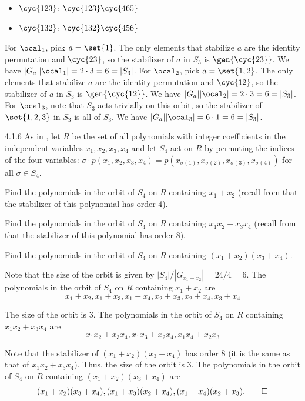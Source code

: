 \begin{solenum}
\begin{itemize}
		\item $\cyc{1 2 3}$: $\cyc{1 2 3}\cyc{4 6 5}$
		\item $\cyc{1 3 2}$: $\cyc{1 3 2}\cyc{4 5 6}$
	\end{itemize}
	For $\ocal_1$, pick $a = \set{1}$.
	The only elements that stabilize $a$ are the identity permutation and $\cyc{2 3}$, so the stabilizer of $a$ in $S_3$ is $\gen{\cyc{2 3}}$.
	We have $|G_a||\ocal_1| = 2 \cdot 3 = 6 = |S_3|$.
	For $\ocal_2$, pick $a = \set{1, 2}$.
	The only elements that stabilize $a$ are the identity permutation and $\cyc{1 2}$, so the stabilizer of $a$ in $S_3$ is $\gen{\cyc{1 2}}$.
	We have $|G_a||\ocal_2| = 2 \cdot 3 = 6 = |S_3|$.
	For $\ocal_3$, note that $S_3$ acts trivially on this orbit, so the stabilizer of $\set{1, 2, 3}$ in $S_3$ is all of $S_3$.
	We have $|G_a||\ocal_3| = 6 \cdot 1 = 6 = |S_3|$.
\end{solenum}

\begin{exercise}{4.1.6}
	As in , let $R$ be the set of all polynomials with integer coefficients in the independent variables \(x_1,x_2,x_3,x_4\) and let $S_4$ act on $R$ by permuting the indices of the four variables: \(\sigma \cdot p(x_1,x_2,x_3,x_4) = p(x_{\sigma(1)}, x_{\sigma(2)}, x_{\sigma(3)}, x_{\sigma(4)})\) for all \(\sigma \in S_4\).
	\begin{subexercises}
		\item Find the polynomials in the orbit of $S_4$ on $R$ containing \(x_1 + x_2\) (recall from  that the stabilizer of this polynomial has order 4).
		\item Find the polynomials in the orbit of $S_4$ on $R$ containing \(x_1 x_2 + x_3 x_4\) (recall from  that the stabilizer of this polynomial has order 8).
		\item Find the polynomials in the orbit of $S_4$ on $R$ containing \((x_1 + x_2)(x_3 + x_4)\).
	\end{subexercises}
\end{exercise}

\begin{solenum}
	\item Note that the size of the orbit is given by \(|S_4|/|G_{x_1 + x_2}| = 24/4 = 6\).
	The polynomials in the orbit of $S_4$ on $R$ containing \(x_1 + x_2\) are
	\[
		x_1 + x_2, x_1 + x_3, x_1 + x_4, x_2 + x_3, x_2 + x_4, x_3 + x_4
	\]
	\item The size of the orbit is 3.
	The polynomials in the orbit of $S_4$ on $R$ containing \(x_1 x_2 + x_3 x_4\) are
	\[
		x_1 x_2 + x_3 x_4, x_1 x_3 + x_2 x_4, x_1 x_4 + x_2 x_3
	\]
	\item Note that the stabilizer of \((x_1 + x_2)(x_3 + x_4)\) has order 8 (it is the same as that of \(x_1 x_2 + x_3 x_4\)).
	Thus, the size of the orbit is 3.
	The polynomials in the orbit of $S_4$ on $R$ containing \((x_1 + x_2)(x_3 + x_4)\) are
	\[
		(x_1 + x_2)(x_3 + x_4), (x_1 + x_3)(x_2 + x_4), (x_1 + x_4)(x_2 + x_3). \qedhere
	\]
\end{solenum}

